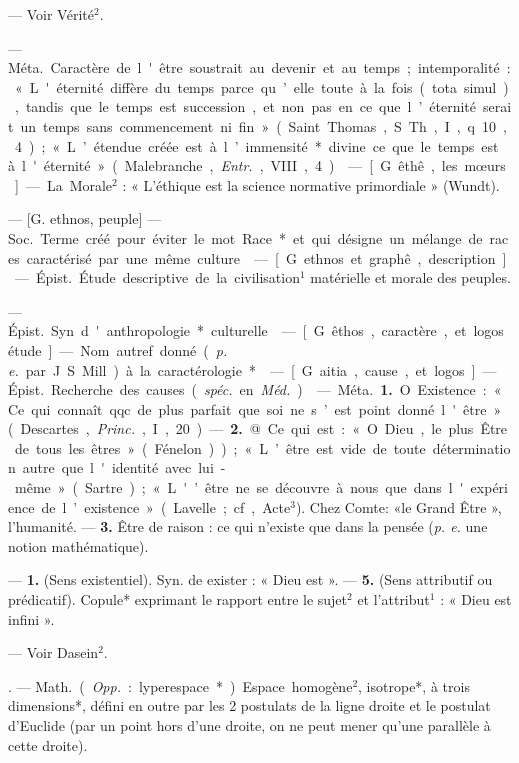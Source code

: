 \begin{itemize}[leftmargin=1cm, label=, itemsep=1pt]
 — Voir Vérité$^2$.

 — \si{Méta.} Caractère de l'être
soustrait au devenir et au temps;
intemporalité : « L'éternité diffère
du temps parce qu’elle toute à la
fois (tota simul), tandis que le temps
est succession, et non pas en ce que
l’éternité serait un temps sans commencement ni fin » (Saint Thomas,
S. Th., I, q. 10, 4); « L’étendue créée
est à l’immensité* divine ce que le
temps est à l'éternité » (Malebranche, {\it Entr.}, VIII, 4).

 — [G. êthê, les mœurs] — La
Morale$^2$ : « L’éthique est la science
normative primordiale » (Wundt).

 — [G. ethnos, peuple] — \si{Soc.}
Terme créé pour éviter le mot Race*
et qui désigne un mélange de races
caractérisé par une même culture.

 — [G. ethnos et graphê,
description] — \si{Épist.} Étude descriptive de la civilisation$^1$ matérielle et morale des peuples.

 — \si{Épist.} Syn. d'anthropologie* culturelle.

 — [G. êthos, caractère, et logos
étude] — Nom autref. donné ({\it p. e.}
par J. S. Mill) à la caractérologie*.

 — [G. aitia, cause, et logos] —
\si{Épist.} Recherche des causes ({\it spéc.}
en \si{{\it Méd.}}).

 — \si{Méta.} {\bf 1.} O Existence :
« Ce qui connaît qqc. de plus parfait
que soi ne s’est point donné l'être »
(Descartes, {\it Princ.}, I, 20). — {\bf 2.} @ Ce
qui est : « O Dieu, le plus Être de
tous les êtres » (Fénelon)); « L’être
est vide de toute détermination
autre que l'identité avec lui-même »
(Sartre); « L'’être ne se découvre à
nous que dans l'expérience de l’existence » (Lavelle; cf, Acte$^3$). Chez
Comte: «le Grand Être », l'humanité.
— {\bf 3.} Être de raison : ce qui n'existe
que dans la pensée ({\it p. e.} une notion
mathématique).

 — {\bf 1.} (Sens existentiel).
Syn. de exister : « Dieu est ». — {\bf 5.}
(Sens attributif ou prédicatif). Copule* exprimant le rapport entre le
sujet$^2$ et l'attribut$^1$ : « Dieu est
infini ».

 — Voir Dasein$^2$.

. — \si{Math.} ({\it Opp.} :
lyperespace*). Espace homogène$^2$,
isotrope*, à trois dimensions*, défini
en outre par les 2 postulats de la
ligne droite et le postulat d'Euclide
(par un point hors d’une droite, on
ne peut mener qu'une parallèle à
cette droite).


\end{itemize}
